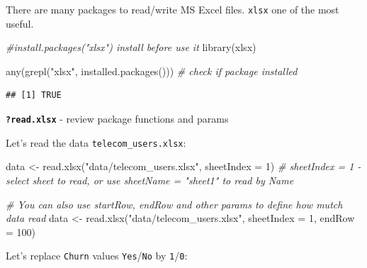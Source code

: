 \documentclass[
]{book}
\newenvironment{Shaded}{\begin{snugshade}}{\end{snugshade}}
\newcommand{\AttributeTok}[1]{\textcolor[rgb]{0.77,0.63,0.00}{#1}}
\newcommand{\CommentTok}[1]{\textcolor[rgb]{0.56,0.35,0.01}{\textit{#1}}}
\newcommand{\DecValTok}[1]{\textcolor[rgb]{0.00,0.00,0.81}{#1}}
\newcommand{\FunctionTok}[1]{\textcolor[rgb]{0.00,0.00,0.00}{#1}}
\newcommand{\NormalTok}[1]{#1}
\newcommand{\OtherTok}[1]{\textcolor[rgb]{0.56,0.35,0.01}{#1}}
\newcommand{\StringTok}[1]{\textcolor[rgb]{0.31,0.60,0.02}{#1}}
\begin{document}
There are many packages to read/write MS Excel files. \texttt{xlsx} one of the most useful.

\begin{Shaded}
\begin{Highlighting}[]
\CommentTok{\#install.packages("xlsx") install before use it}
\FunctionTok{library}\NormalTok{(xlsx)}
\end{Highlighting}
\end{Shaded}

\begin{Shaded}
\begin{Highlighting}[]
\FunctionTok{any}\NormalTok{(}\FunctionTok{grepl}\NormalTok{(}\StringTok{"xlsx"}\NormalTok{, }\FunctionTok{installed.packages}\NormalTok{())) }\CommentTok{\# check if package installed}
\end{Highlighting}
\end{Shaded}

\begin{verbatim}
## [1] TRUE
\end{verbatim}

\textbf{\texttt{?read.xlsx}} - review package functions and params

Let's read the data \texttt{telecom\_users.xlsx}:

\begin{Shaded}
\begin{Highlighting}[]
\NormalTok{data }\OtherTok{\textless{}{-}} \FunctionTok{read.xlsx}\NormalTok{(}\StringTok{"data/telecom\_users.xlsx"}\NormalTok{, }\AttributeTok{sheetIndex =} \DecValTok{1}\NormalTok{)}
\CommentTok{\# sheetIndex = 1 {-} select sheet to read, or use sheetName = "sheet1" to read by Name}
\end{Highlighting}
\end{Shaded}

\begin{Shaded}
\begin{Highlighting}[]
\CommentTok{\# You can also use startRow, endRow and other params to define how mutch data read}
\NormalTok{data }\OtherTok{\textless{}{-}} \FunctionTok{read.xlsx}\NormalTok{(}\StringTok{"data/telecom\_users.xlsx"}\NormalTok{, }\AttributeTok{sheetIndex =} \DecValTok{1}\NormalTok{, }\AttributeTok{endRow =} \DecValTok{100}\NormalTok{)}
\end{Highlighting}
\end{Shaded}

Let's replace \texttt{Churn} values \texttt{Yes}/\texttt{No} by \texttt{1}/\texttt{0}:
\end{document}

